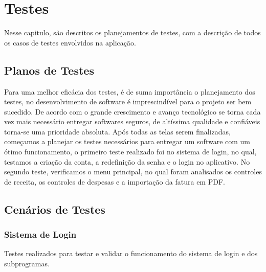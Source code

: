 % 

\chapter[Testes]{Testes}

Nesse capitulo, são descritos os planejamentos de testes, com a descrição de todos os casos de testes envolvidos na aplicação.

\section{Planos de Testes}

Para uma melhor eficácia dos testes, é de suma importância o planejamento dos testes, no desenvolvimento de software é imprescindível para o projeto ser bem sucedido. De acordo com o grande crescimento e avanço tecnológico se torna cada vez mais necessário entregar softwares seguros, de altíssima qualidade e confiáveis torna-se uma prioridade absoluta. 
Após todas as telas serem finalizadas, começamos a planejar os testes necessários para entregar um software com um ótimo funcionamento, o primeiro teste realizado foi no sistema de login, no qual, testamos a criação da conta, a redefinição da senha e o login no aplicativo. No segundo teste, verificamos o menu principal, no qual foram analisados os controles de receita, os controles de despesas e a importação da fatura em PDF. 


\section{Cenários de Testes}

\subsection{Sistema de Login}

Testes realizados para testar e validar o funcionamento do sistema de login e dos subprogramas.

\vspace{\baselineskip}
\vspace{\baselineskip}
\vspace{\baselineskip}
\vspace{\baselineskip}
\vspace{\baselineskip}
\vspace{\baselineskip}
\vspace{\baselineskip}
\vspace{\baselineskip}
\vspace{\baselineskip}
\vspace{\baselineskip}
\vspace{\baselineskip}

